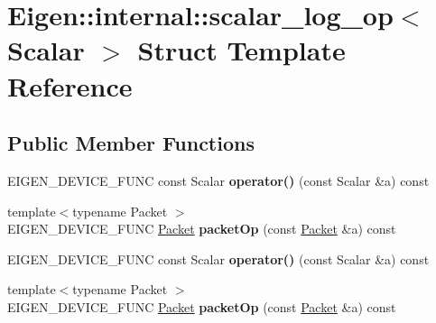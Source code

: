 \hypertarget{struct_eigen_1_1internal_1_1scalar__log__op}{}\section{Eigen\+:\+:internal\+:\+:scalar\+\_\+log\+\_\+op$<$ Scalar $>$ Struct Template Reference}
\label{struct_eigen_1_1internal_1_1scalar__log__op}
\subsection*{Public Member Functions}
\begin{DoxyCompactItemize}
\item 
\mbox{\label{struct_eigen_1_1internal_1_1scalar__log__op_a5a3bf7b2b930acc86457b63b664ee870}} 
E\+I\+G\+E\+N\+\_\+\+D\+E\+V\+I\+C\+E\+\_\+\+F\+U\+NC const Scalar {\bfseries operator()} (const Scalar \&a) const
\item 
\mbox{\label{struct_eigen_1_1internal_1_1scalar__log__op_a6328839017cffa9c646ac8843c1d318f}} 
{\footnotesize template$<$typename Packet $>$ }\\E\+I\+G\+E\+N\+\_\+\+D\+E\+V\+I\+C\+E\+\_\+\+F\+U\+NC \hyperlink{union_eigen_1_1internal_1_1_packet}{Packet} {\bfseries packet\+Op} (const \hyperlink{union_eigen_1_1internal_1_1_packet}{Packet} \&a) const
\item 
\mbox{\label{struct_eigen_1_1internal_1_1scalar__log__op_a5a3bf7b2b930acc86457b63b664ee870}} 
E\+I\+G\+E\+N\+\_\+\+D\+E\+V\+I\+C\+E\+\_\+\+F\+U\+NC const Scalar {\bfseries operator()} (const Scalar \&a) const
\item 
\mbox{\label{struct_eigen_1_1internal_1_1scalar__log__op_a6328839017cffa9c646ac8843c1d318f}} 
{\footnotesize template$<$typename Packet $>$ }\\E\+I\+G\+E\+N\+\_\+\+D\+E\+V\+I\+C\+E\+\_\+\+F\+U\+NC \hyperlink{union_eigen_1_1internal_1_1_packet}{Packet} {\bfseries packet\+Op} (const \hyperlink{union_eigen_1_1internal_1_1_packet}{Packet} \&a) const
\end{DoxyCompactItemize}


